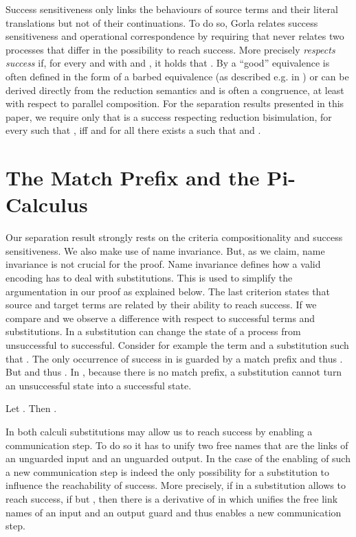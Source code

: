 \documentclass[final,copyright,creativecommons]{eptcs}
\begin{document}
Success sensitiveness only links the behaviours of source terms and their literal translations but not of their continuations. To do so, Gorla relates success sensitiveness and operational correspondence by requiring that  never relates two processes that differ in the possibility to reach success. More precisely  \emph{respects success} if, for every  and  with  and , it holds that .
By \cite{gorla} a ``good'' equivalence  is often defined in the form of a barbed equivalence (as described e.g. in \cite{milnerSangiorgi92}) or can be derived directly from the reduction semantics and is often a congruence, at least with respect to parallel composition. For the separation results presented in this paper, we require only that  is a success respecting reduction bisimulation, \ie for every  such that ,  iff  and for all  there exists a  such that  and .



\section{The Match Prefix and the Pi-Calculus}
\label{sec:encodeMatch}

Our separation result strongly rests on the criteria compositionality and success sensitiveness.
We also make use of name invariance.
But, as we claim, name invariance is not crucial for the proof. Name invariance defines how a valid encoding has to deal with substitutions. This is used to simplify the argumentation in our proof as explained below.
The last criterion states that source and target terms are related by their ability to reach success.
If we compare \piT and \piNM we observe a difference with respect to successful terms and substitutions.
In \piT a substitution can change the state of a process from unsuccessful to successful. Consider for example the term  and a substitution  such that . The only occurrence of success in  is guarded by a match prefix and thus . But  and thus .
In \piNM, because there is no match prefix, a substitution cannot turn an unsuccessful state into a successful state.

\begin{lemma}
	\label{prop:propequiv}
	Let . Then .
\end{lemma}

In both calculi substitutions may allow us to reach success by enabling a communication step. To do so it has to unify two free names that are the links of an unguarded input and an unguarded output. In the case of \piNM the enabling of such a new communication step is indeed the only possibility for a substitution to influence the reachability of success.
More precisely, if in \piNM a substitution  allows to reach success, \ie if  but , then there is a derivative of  in which  unifies the free link names of an input and an output guard and thus enables a new communication step.
\end{document}
